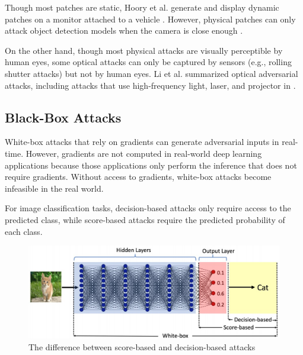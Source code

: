 Though most patches are static, Hoory et al. generate and display dynamic patches on a monitor attached to a vehicle \citep{hoory2020dynamic}. However, physical patches can only attack object detection models when the camera is close enough \citep{wang2021daedalus, lu2021scale}.

On the other hand, though most physical attacks are visually perceptible by human eyes, some optical attacks can only be captured by sensors (e.g., rolling shutter attacks) but not by human eyes. Li et al. summarized optical adversarial attacks, including attacks that use high-frequency light, laser, and projector in \citep{li2022survey}.



\subsection{Black-Box Attacks}
\label{sec:blackbox_attack}

White-box attacks that rely on gradients can generate adversarial inputs in real-time. However, gradients are not computed in real-world deep learning applications because those applications only perform the inference that does not require gradients. Without access to gradients, white-box attacks become infeasible in the real world.

For image classification tasks, decision-based attacks only require access to the predicted class, while score-based attacks require the predicted probability of each class.

\begin{figure}[H]
\centering
\includegraphics[scale=0.35]{figures/chapter_intro/score-decision.jpg}
\caption{The difference between score-based and decision-based attacks \citep{chen2020hopskipjumpattack}}
\label{fig.decision}
\end{figure}

